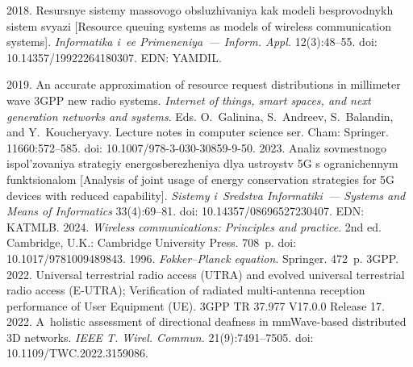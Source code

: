 \begin{multicols}{2}
{{\begin{thebibliography}{99}
 2018. 
Resursnye sistemy massovogo obsluzhivaniya kak modeli besprovodnykh sistem svyazi [Resource 
queuing systems as models of wireless communication systems]. \textit{Informatika i~ee 
Primeneniya~--- Inform. Appl.} 12(3):48--55. doi: 10.14357/19922264180307. EDN: YAMDIL.

 2019. An accurate 
approximation of resource request distributions in millimeter wave 3GPP new radio systems. 
\textit{Internet of things, smart spaces, and next generation networks and systems}. Eds. O.~Ga\-li\-ni\-na, 
S.~And\-re\-ev, S.~Balandin, and Y.~Koucheryavy. Lecture notes in computer science ser. Cham: 
Springer. 11660:572--585. doi: 10.1007/978-3-030-30859-9-50.
 2023. Analiz sovmestnogo ispol'zovaniya strategiy energosberezheniya dlya 
ustroystv 5G s ogranichennym funktsionalom [Analysis of joint usage of energy conservation 
strategies for 5G devices with reduced capability]. \textit{Sistemy i~Sredstva Informatiki~--- Systems 
and Means of Informatics} 33(4):69--81. doi: 10.14357/08696527230407. EDN: KATMLB.
 2024. \textit{Wireless communications: Principles and practice}. 2nd ed. 
Cambridge, U.K.: Cambridge University Press. 708~p. doi: 10.1017/9781009489843.
 1996. \textit{Fokker--Planck equation}. Springer. 472~p.
3GPP. 2022. Universal terrestrial radio access (UTRA) and evolved universal terrestrial radio access 
(E-UTRA); Verification of radiated multi-antenna reception performance of User Equipment (UE). 
3GPP TR 37.977 V17.0.0 Release 17.  
 2022. A~holistic assessment of directional deafness in mmWave-based distributed 3D 
networks. \textit{IEEE T. Wirel. Commun.} 21(9):7491--7505. doi: 10.1109/TWC.2022.3159086.



\end{thebibliography}

 }
 }

\end{multicols}

\vspace*{-6pt}

